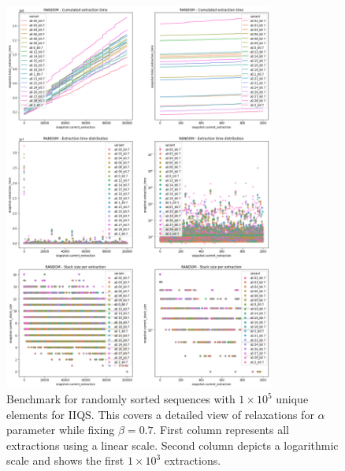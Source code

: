 \begin{figure}[p]
    \centering
    \includegraphics[width=0.79\textwidth]{./fragments/04_experimental_execution/images/04_alphabeta_detail_random_left.png}
    \caption{Benchmark for randomly sorted sequences with $1\times10^5$ unique elements for IIQS. This covers a detailed view of relaxations for $\alpha$ parameter while fixing $\beta=0.7$. First column represents all extractions using a linear scale. Second column depicts a logarithmic scale and shows the first $1\times10^3$ extractions. }
    \label{FIG:05_ALPHABETA_BENCHMARK_RANDOM_LEFT}
\end{figure}

